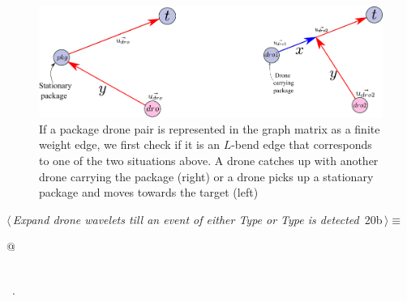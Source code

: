 \documentclass[10pt, english, oneside]{report}
\begin{document}
\begin{figure}[H]
\centering
\includegraphics[width=18cm]{docs/lbend.pdf}
\caption{If a package drone pair is represented in the graph matrix as a finite weight edge, we first 
check if it is an $L$-bend edge that corresponds to one of the two situations above. A drone catches
up with another drone carrying the package (right) or a drone picks up a stationary package and moves
towards the target (left)}
\end{figure}


\begin{flushleft} \small
\begin{minipage}{\linewidth}\label{scrap18}\raggedright\small
{} $\langle\,${\itshape Expand drone wavelets till an event of either Type  or Type  is detected}\nobreak\ {\footnotesize {20b}}$\,\rangle\equiv$
\vspace{-1ex}
\begin{list}{}{} \item
\mbox{}\verb@   @\\
\mbox{}\verb@pass@\\
\mbox{}\verb@@{\NWsep}
\end{list}
\vspace{-1.5ex}
\footnotesize
\begin{list}{}{\setlength{\itemsep}{-\parsep}\setlength{\itemindent}{-\leftmargin}}
\item \NWtxtMacroRefIn\ .

\item{}
\end{list}
\end{minipage}\vspace{4ex}
\end{flushleft}
\end{document}
